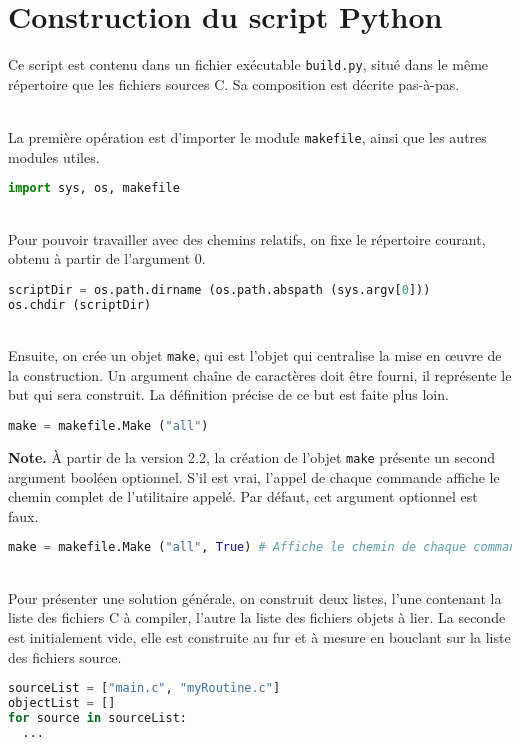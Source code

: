 \documentclass[a4paper,11pt]{extarticle}
\begin{document}
\section{Construction du script Python}

Ce script est contenu dans un fichier exécutable \texttt{build.py}, situé dans le même répertoire que les fichiers sources C. Sa composition est décrite pas-à-pas.

~\\La première opération est d'importer le module \texttt{makefile}, ainsi que les autres modules utiles.
\begin{lstlisting}[language=py]
import sys, os, makefile
\end{lstlisting}

~\\Pour pouvoir travailler avec des chemins relatifs, on fixe le répertoire courant, obtenu à partir de l'argument $0$.
\begin{lstlisting}[language=py]
scriptDir = os.path.dirname (os.path.abspath (sys.argv[0]))
os.chdir (scriptDir)
\end{lstlisting}

~\\Ensuite, on crée un objet \texttt{make}, qui est l'objet qui centralise la mise en œuvre de la construction. Un argument chaîne de caractères doit être fourni, il représente le but qui sera construit. La définition précise de ce but est faite plus loin.
\begin{lstlisting}[language=py]
make = makefile.Make ("all")
\end{lstlisting}

{\bf Note.}\label{logUtilityToolPath} À partir de la version 2.2, la création de l'objet \texttt{make} présente un second argument booléen optionnel. S'il est vrai, l'appel de chaque commande affiche le chemin complet de l'utilitaire appelé. Par défaut, cet argument optionnel est faux.
\begin{lstlisting}[language=py]
make = makefile.Make ("all", True) # Affiche le chemin de chaque commande appelee
\end{lstlisting}

~\\Pour présenter une solution générale, on construit deux listes, l'une contenant la liste des fichiers C à compiler, l'autre la liste des fichiers objets à lier. La seconde est initialement vide, elle est construite au fur et à mesure en bouclant sur la liste des fichiers source. 
\begin{lstlisting}[language=py]
sourceList = ["main.c", "myRoutine.c"]
objectList = []
for source in sourceList:
  ...
\end{lstlisting}
\end{document}
